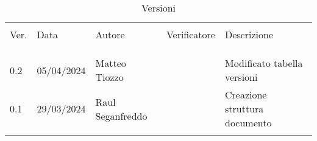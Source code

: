 \documentclass[italian,12pt]{article} %
\begin{document}


\newpage



\begin{table}[!h]
	\caption*{Versioni}
	\begin{center}
		\begin{tabular}{ l l l l l}
			\hline\\[-2ex]
			Ver. & Data       & Autore           & Verificatore   & Descrizione\\
			\\[-2ex] \hline \\[-1.5ex] \\
			0.2  & 05/04/2024 & Matteo Tiozzo    &  & Modificato tabella versioni\\
			0.1  & 29/03/2024 & Raul Seganfreddo &  & Creazione struttura documento\\
			\\[-1.5ex] \hline
		\end{tabular}
	\end{center}
\end{table}

\newpage

\tableofcontents

\listoftables

\listoffigures

\newpage















\end{document}
